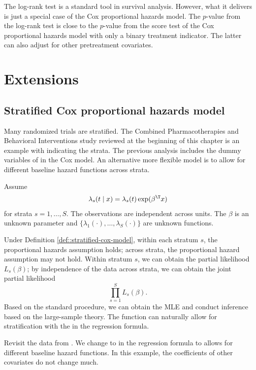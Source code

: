 The log-rank test is a standard tool in survival analysis. However, what it delivers is just a special case of the Cox proportional hazards model. The $p$-value from the log-rank test is close to the $p$-value from the score test of the Cox proportional hazards model with only a binary treatment indicator. The latter can also adjust for other pretreatment covariates. 

 
 
\section{Extensions}


\subsection{Stratified Cox proportional hazards model}

Many randomized trials are stratified. The Combined Pharmacotherapies and Behavioral Interventions study reviewed at the beginning of this chapter is an example with  indicating the strata. The previous analysis includes the dummy variables of   in the Cox model. An alternative more flexible model is to allow for different baseline hazard functions across strata. 

\begin{definition}
\label{def::stratified-cox-model}
Assume
$$
\lambda_s(t \mid x) = \lambda_s(t) \exp(\beta^{\T} x)
$$
for strata $s = 1,\ldots, S$. The observations are independent across units. The $\beta$ is an unknown parameter and $\{ \lambda_1(\cdot), \ldots, \lambda_S(\cdot) \}$ are unknown functions. 
\end{definition}

Under Definition \ref{def::stratified-cox-model}, within each stratum $s$, the proportional hazards assumption holds; across strata, the proportional hazard assumption may not hold. Within stratum $s$, we can obtain the partial likelihood $L_s(\beta)$; by independence of the data across strata, we can obtain the joint partial likelihood 
$$
\prod_{s=1}^S L_s(\beta) .
$$
Based on the standard procedure, we can obtain the MLE and conduct inference based on the large-sample theory. The  function can naturally allow for stratification with the  in the regression formula.

Revisit the data from \citet{lin2016simultaneous}. We change  to  in the regression formula to allows for different baseline hazard functions. In this example, the coefficients of other covariates do not change much. 

